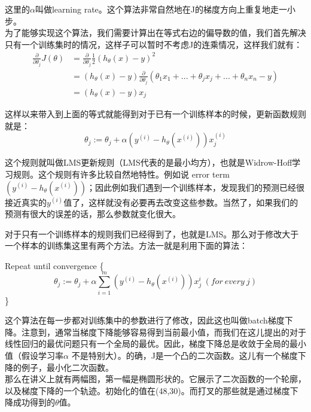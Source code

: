 \documentclass[UTF8]{ctexart}
\begin{document}
这里的$\alpha$叫做learning rate。这个算法非常自然地在J的梯度方向上重复地走一小步。 \\

为了能够实现这个算法，我们需要计算出在等式右边的偏导数的值，我们首先解决只有一个训练集时的情况，这样子可以暂时不考虑J的连乘情况，这样我们就有：\\

\begin{align*}
\frac{\partial}{\partial \theta_{j}}J(\theta)  &=  \frac{\partial}{\partial \theta_{j}}\frac{1}{2} (h_{\theta}(x)-y)^{2} \\
&=     (h_{\theta}(x)-y) \frac{\partial}{\partial \theta_{j}}   (\theta_{1}x_{1}+...+\theta_{j}x_{j}+...+\theta_{n}x_{n} - y)\\
&= (h_{\theta}(x)-y)x_{j}
\end{align*}

这样以来带入到上面的等式就能得到对于已有一个训练样本的时候，更新函数规则就是：
\[ \theta_{j}:= \theta_{j} + \alpha  (y^{(i)}-h_{\theta}(x^{(i)})) x_{j}^{(i)} \]

这个规则就叫做LMS更新规则（LMS代表的是最小均方），也就是Widrow-Hoff学习规则。这个规则有许多比较自然地特性。例如说 error term $ (y^{(i)}-h_{\theta}(x^{(i)})) $；因此例如我们遇到一个训练样本，发现我们的预测已经很接近真实的$y^{(i)}$值了，这样就没有必要再去改变这些参数。当然了，如果我们的预测有很大的误差的话，那么参数就变化很大。

对于只有一个训练样本的规则我们已经得到了，也就是LMS。那么对于修改大于一个样本的训练集这里有两个方法。方法一就是利用下面的算法：

Repeat until convergence \{ 
  \[ \theta_{j}:= \theta_{j} + \alpha \sum_{i=1}^{m}{ (y^{(i)}-h_{\theta}(x^{(i)})) x_{j}^{i} }  \ (for\ every\ j)\]
\}

这个算法在每一步都对训练集中的参数进行了修改，因此这也叫做batch梯度下降。注意到，通常当梯度下降能够容易得到当前最小值，而我们在这儿提出的对于线性回归的最优问题只有一个全局的最优。因此，梯度下降总是收敛于全局的最小值（假设学习率$\alpha$ 不是特别大）。的确，J是一个凸的二次函数。这儿有一个梯度下降的例子，最小化二次函数。\\

那么在讲义上就有两幅图，第一幅是椭圆形状的。它展示了二次函数的一个轮廓，以及梯度下降的一个轨迹。初始化的值在(48,30)。而打叉的那些就是通过梯度下降成功得到的$\theta$值。\\


\begin{figure}[htb]        
\end{figure}
\end{document}
